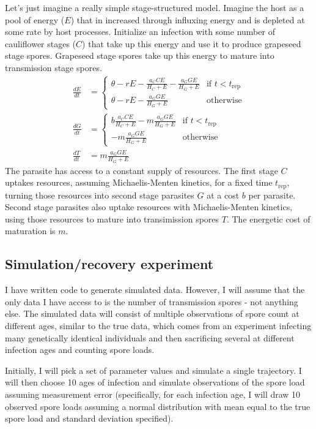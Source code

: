 \documentclass[12pt,reqno,final,pdftex]{amsart}\usepackage[]{graphicx}\usepackage[]{color}
\theoremstyle{plain}
\numberwithin{equation}{part}
\begin{document}
Let's just imagine a really simple stage-structured model.
Imagine the host as a pool of energy ($E$) that in increased through influxing energy and is depleted at some rate by host processes.
Initialize an infection with some number of cauliflower stages ($C$) that take up this energy and use it to produce grapeseed stage spores.
Grapeseed stage spores take up this energy to mature into transmission stage spores.
\begin{align*}
\frac{dE}{dt} &=
\begin{cases}
\theta - rE - \frac{a_C C E}{H_C + E} - \frac{a_G G E}{H_G + E} & \text{if $t < t_{\text{rep}}$} \\
\theta - rE - \frac{a_G G E}{H_G + E} & \text{otherwise}
\end{cases}
\\
\frac{dG}{dt} &=
\begin{cases}
b \frac{a_C C E}{H_C + E} - m \frac{a_G G E}{H_G + E} & \text{if $t < t_{\text{rep}}$} \\
-m \frac{a_G G E}{H_G + E} & \text{otherwise}
\end{cases}
\\
\frac{dT}{dt} &=  m \frac{a_G G E}{H_G + E}
\end{align*}
The parasite has access to a constant supply of resources.
The first stage $C$ uptakes resources, assuming Michaelis-Menten kinetics, for a fixed time $t_{\text{rep}}$, turning those resources into second stage parasites $G$ at a cost $b$ per parasite.
Second stage parasites also uptake resources with Michaelis-Menten kinetics, using those resources to mature into transimission spores $T$.
The energetic cost of maturation is $m$.

\subsection*{Simulation/recovery experiment}
I have written code to generate simulated data.
However, I will assume that the only data I have access to is the number of transmission spores - not anything else.
The simulated data will consist of multiple observations of spore count at different ages, similar to the true data, which comes from an experiment infecting many genetically identical individuals and then sacrificing several at different infection ages and counting spore loads.

Initially, I will pick a set of parameter values and simulate a single trajectory.
I will then choose 10 ages of infection and simulate observations of the spore load assuming measurement error (specifically, for each infection age, I will draw 10 observed spore loads assuming a normal distribution with mean equal to the true spore load and standard deviation specified).
\end{document}
